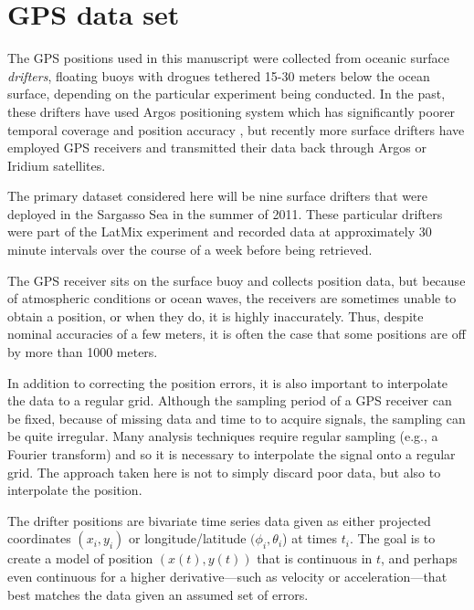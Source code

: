 \documentclass[10pt,journal]{IEEEtran}
\begin{document}
\section{GPS data set}
\label{sec:drifter_data_set}

The GPS positions used in this manuscript were collected from oceanic surface \emph{drifters}, floating buoys with drogues tethered 15-30 meters below the ocean surface, depending on the particular experiment being conducted. In the past, these drifters have used Argos positioning system which has significantly poorer temporal coverage and position accuracy \cite{elipot2016-jgr}, but recently more surface drifters have employed GPS receivers and transmitted their data back through Argos or Iridium satellites.

The primary dataset considered here will be nine surface drifters that were deployed in the Sargasso Sea in the summer of 2011. These particular drifters were part of the LatMix experiment \cite{shcherbina2015-bams} and recorded data at approximately 30 minute intervals over the course of a week before being retrieved.

The GPS receiver sits on the surface buoy and collects position data, but because of atmospheric conditions or ocean waves, the receivers are sometimes unable to obtain a position, or when they do, it is highly inaccurately. Thus, despite nominal accuracies of a few meters, it is often the case that some positions are off by more than 1000 meters.

In addition to correcting the position errors, it is also important to interpolate the data to a regular grid. Although the sampling period of a GPS receiver can be fixed, because of missing data and time to to acquire signals, the sampling can be quite irregular.  Many analysis techniques require regular sampling (e.g., a Fourier transform) and so it is necessary to interpolate the signal onto a regular grid. The approach taken here is not to simply discard poor data, but also to interpolate the position.



The drifter positions are bivariate time series data given as either projected coordinates $(x_i, y_i)$ or longitude/latitude $(\phi_i, \theta_i$) at times $t_i$. The goal is to create a model of position $(x(t),y(t))$ that is continuous in $t$, and perhaps even continuous for a higher derivative---such as velocity or acceleration---that best matches the data given an assumed set of errors.
\end{document}
